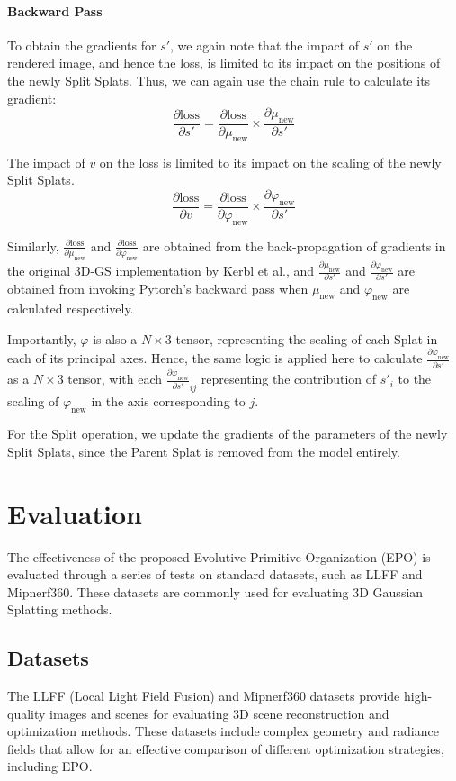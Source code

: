 \documentclass[11pt]{report}
\begin{document}
\subsubsection{Backward Pass}
To obtain the gradients for $s'$, we again note that the impact of $s'$ on the rendered image, and hence the loss, is limited to its impact on the positions of the newly Split Splats. Thus, we can again use the chain rule to calculate its gradient:
\[ \frac{\partial \text{loss}}{\partial s'} = \frac{\partial \text{loss}}{\partial \mu_{\text{new}}} \times \frac{\partial \mu_{\text{new}}}{\partial s'} \]

The impact of $v$ on the loss is limited to its impact on the scaling of the newly Split Splats.
\[ \frac{\partial \text{loss}}{\partial v} = \frac{\partial \text{loss}}{\partial \varphi_{\text{new}}} \times \frac{\partial \varphi_{\text{new}}}{\partial s'} \]

Similarly, $\frac{\partial \text{loss}}{\partial \mu_{\text{new}}}$ and $\frac{\partial \text{loss}}{\partial \varphi_{\text{new}}}$ are obtained from the back-propagation of gradients in the original 3D-GS implementation by Kerbl et al., and $\frac{\partial \mu_{\text{new}}}{\partial s'}$ and $\frac{\partial \varphi_{\text{new}}}{\partial s'}$ are obtained from invoking Pytorch's backward pass when $\mu_{\text{new}}$ and $\varphi_{\text{new}}$ are calculated respectively.

Importantly, $\varphi$ is also a $N \times 3$ tensor, representing the scaling of each Splat in each of its principal axes. Hence, the same logic is applied here to calculate $\frac{\partial \varphi_{\text{new}}}{\partial s'}$ as a $N \times 3$ tensor, with each $\frac{\partial \varphi_{\text{new}}}{\partial s'}_{ij}$ representing the contribution of $s'_{i}$ to the scaling of $\varphi_{\text{new}}$ in the axis corresponding to $j$.

For the Split operation, we update the gradients of the parameters of the newly Split Splats, since the Parent Splat is removed from the model entirely.

\chapter{Evaluation}
The effectiveness of the proposed Evolutive Primitive Organization (EPO) is evaluated through a series of tests on standard datasets, such as LLFF and Mipnerf360. These datasets are commonly used for evaluating 3D Gaussian Splatting methods.


\section{Datasets}
The LLFF (Local Light Field Fusion) and Mipnerf360 datasets provide high-quality images and scenes for evaluating 3D scene reconstruction and optimization methods. These datasets include complex geometry and radiance fields that allow for an effective comparison of different optimization strategies, including EPO.
\end{document}
